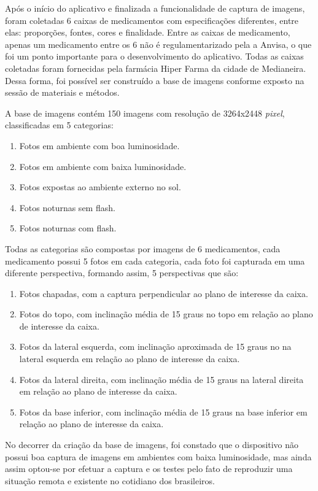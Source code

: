 Após o início do aplicativo e finalizada a funcionalidade de captura de imagens, foram coletadas 6 caixas de medicamentos com especificações diferentes, entre elas: proporções, fontes, cores e finalidade. Entre as caixas de medicamento, apenas um medicamento entre os 6 não é regulamentarizado pela a Anvisa, o que foi um ponto importante para o desenvolvimento do aplicativo. Todas as caixas coletadas foram fornecidas pela farmácia Hiper Farma da cidade de Medianeira. Dessa forma, foi possível ser construído a base de imagens conforme exposto na sessão de materiais e métodos.

A base de imagens contém 150 imagens com resolução de 3264x2448 \textit{pixel}, classificadas em 5 categorias: 

  \begin{enumerate}
   \item Fotos em ambiente com boa luminosidade.
   \item Fotos em ambiente com baixa luminosidade.
   \item Fotos expostas ao ambiente externo no sol.
   \item Fotos noturnas sem flash.
   \item Fotos noturnas com flash.
 \end{enumerate}
 


 Todas as categorias são compostas por imagens de 6 medicamentos, cada medicamento possui 5 fotos em cada categoria, cada foto foi capturada em uma diferente perspectiva, formando assim, 5 perspectivas que são:
   \begin{enumerate}
   \item Fotos chapadas, com a captura perpendicular ao plano de interesse da caixa.
   \item Fotos do topo, com inclinação média de 15 graus no topo em relação ao plano de interesse da caixa.
    \item Fotos da lateral esquerda, com inclinação aproximada de 15 graus no na lateral esquerda em relação ao plano de interesse da caixa.
    \item Fotos da lateral direita, com inclinação média de 15 graus na lateral direita em relação ao plano de interesse da caixa.
    \item Fotos da base inferior, com inclinação média de 15 graus na base inferior em relação ao plano de interesse da caixa.
 \end{enumerate}
 
 No decorrer da criação da base de imagens, foi constado que o dispositivo não possui boa captura de imagens em ambientes com baixa luminosidade, mas ainda assim optou-se por efetuar a captura e os testes pelo fato de reproduzir uma situação remota e existente no cotidiano dos brasileiros.
 
